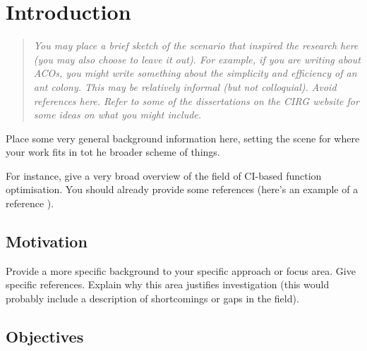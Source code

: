 
\chapter{Introduction}
\label{chap:introduction}
\pagestyle{headings}
\setcounter{page}{1}


\begin{quote}
	{\it You may place a brief sketch of the scenario that inspired the research here (you may also choose to leave it out). For example, if you are writing about ACOs, you might write something about the simplicity and efficiency of an ant colony. This may be relatively informal (but not colloquial). Avoid references here. Refer to some of the dissertations on the CIRG website for some ideas on what you might include.}
\end{quote}
Place some very general background information here, setting the scene for where your work fits in tot he broader scheme of things.

For instance, give a very broad overview of the field of CI-based function optimisation. You should already provide some references (here's an example of a reference \cite{ref:Engelbrecht:2002}).


\section{Motivation}
\label{sec:introduction:motivation}

Provide a more specific background to your specific approach or focus area. Give specific references. Explain why this area justifies investigation (this would probably include a description of shortcomings or gaps in the field).


\section{Objectives}
\label{sec:introduction:objectives}


